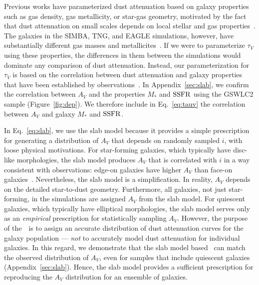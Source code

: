 Previous works have parameterized dust attenuation based on galaxy properties
such as gas density, gas metallicity, or star-gas geometry, motivated by
the fact that dust attenuation on small scales depends on local stellar and gas
properties~\citep[\eg][]{somerville1999, somerville2012, steinacker2013,
camps2015, narayanan2018, trayford2020, vogelsberger2020}. 
The galaxies in the SIMBA, TNG, and EAGLE simulations, however, have
substantially different gas masses and metallicites~\citep[][Maller \etal~in prep.]{dave2020}.  
If we were to parameterize $\tau_V$ using these properties, the differences
in them between the simulations would dominate any comparison of dust attenuation.
Instead, our parameterization for $\tau_V$ is based on the correlation between
dust attenuation and galaxy properties that have been established by
observations~\citep[\eg~][]{garn2010, battisti2016, salim2020}.
In Appendix~\ref{sec:slab}, we confirm the correlation between $A_V$ and
the properties $M_*$ and ${\rm SSFR}$ using the \cite{salim2018} GSWLC2 sample
(Figure~\ref{fig:dep}). 
We therefore include in Eq.~\ref{eq:tauv} the correlation between $A_V$ and
galaxy $M_*$ and ${\rm SSFR}$.


In Eq.~\ref{eq:slab}, we use the slab model because it provides a simple
prescription for generating a distribution of $A_V$ that depends on
randomly sampled $i$, with loose physical motivations.
For star-forming galaxies, which typically have disc-like morphologies, the
slab model produces $A_V$ that is correlated with $i$ in a way consistent
with observations: edge-on galaxies have higher $A_V$ than face-on
galaxies~\citep[\eg][]{conroy2010, wild2011, battisti2017, salim2020}.
Nevertheless, the slab model is a simplification. 
In reality, $A_V$ depends on the detailed star-to-dust geometry.
Furthermore, all galaxies, not just star-forming, in the simulations are
assigned $A_V$ from the slab model.
For quiescent galaxies, which typically have elliptical morphologies, the
slab model serves only as an \emph{empirical} prescription for statistically 
sampling $A_V$. 
However, the purpose of the~\eda~is to assign an accurate distribution of dust
attenuation curves for the galaxy population --- \emph{not} to accurately
model dust attenuation for individual galaxies.
In this regard, we demonstrate that the slab model based \eda~can match the
observed distribution of $A_V$, even for samples that include quiescent
galaxies (Appendix~\ref{sec:slab}).
Hence, the slab model provides a sufficient prescription for reproducing
the $A_V$ distribution for an ensemble of galaxies. 

